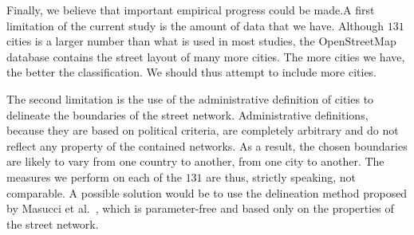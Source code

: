 Finally, we believe that important empirical progress could be made.A first
limitation of the current study is the amount of data that we have.  Although
$131$ cities is a larger number than what is used in most studies, the
OpenStreetMap database contains the street layout of many more cities. The more
cities we have, the better the classification. We should thus attempt to include
more cities.

The second limitation is the use of the administrative definition of cities to
delineate the boundaries of the street network. Administrative definitions,
because they are based on political criteria, are completely arbitrary and do
not reflect any property of the contained networks. As a result, the chosen
boundaries are likely to vary from one country to another, from one city to
another. The measures we perform on each of the $131$ are thus, strictly
speaking, not comparable. A possible solution would be to use the delineation
method proposed by Masucci et al.~\cite{Masucci:2015}, which is parameter-free
and based only on the properties of the street network.
